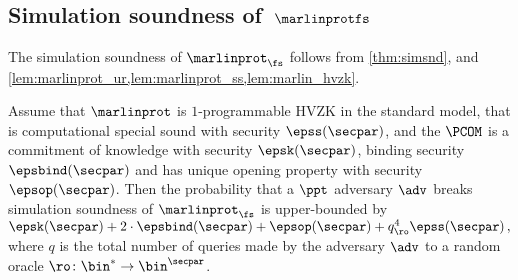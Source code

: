 \subsection{Simulation soundness of~$\marlinprotfs$}
	The simulation soundness of $\marlinprot_\fs$ follows from \cref{thm:simsnd}, and \cref{lem:marlinprot_ur,lem:marlinprot_ss,lem:marlin_hvzk}.
\begin{corollary}
	\label{cor:simsnd-M}
	Assume that $\marlinprot$ is $1$-programmable HVZK in the standard model, that
	is computational special sound with security $\epss(\secpar)$, and the $\PCOM$ is a commitment of knowledge with
	security $\epsk(\secpar)$, binding security $\epsbind(\secpar)$ and has unique
	opening property with security $\epsop(\secpar)$. Then the probability that a
	$\ppt$ adversary $\adv$ breaks simulation soundness of $\marlinprot_{\fs}$ is
	upper-bounded by
	\( \epsk(\secpar) + 2\cdot\epsbind(\secpar) + \epsop(\secpar) + q_\ro^4
	\epss(\secpar)\,, \) where $q$ is the total number of queries made by the
	adversary $\adv$ to a random oracle $\ro\colon \bin^{*} \to \bin^{\secpar}$.
\end{corollary}


